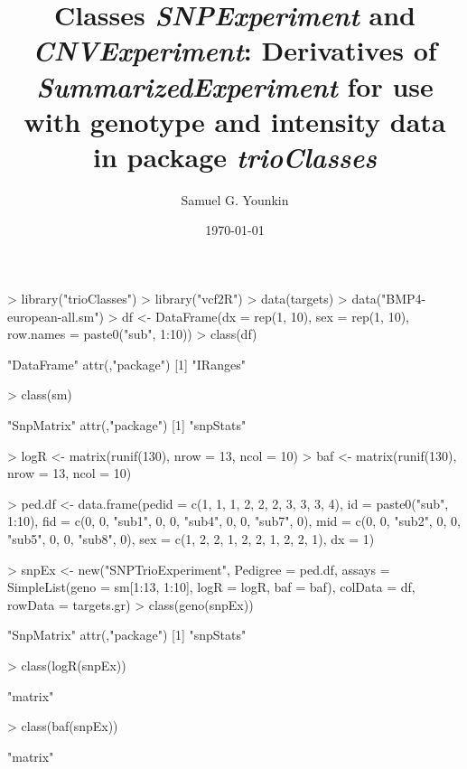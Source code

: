 \documentclass[10pt]{article}
\title{Classes \emph{SNPExperiment} and \emph{CNVExperiment}: Derivatives of \emph{SummarizedExperiment} for use with genotype and intensity data in package \emph{trioClasses}}
\author{Samuel G. Younkin}
\date{\today}
\begin{document}
\setlength{\parskip}{0.2\baselineskip}
\setlength{\parindent}{0pt}
\maketitle
\begin{Schunk}
\begin{Sinput}
> library("trioClasses")
> library("vcf2R")
> data(targets)
> data("BMP4-european-all.sm")
> df <- DataFrame(dx = rep(1, 10), sex = rep(1, 10), row.names = paste0("sub", 
     1:10))
> class(df)
\end{Sinput}
\begin{Soutput}
[1] "DataFrame"
attr(,"package")
[1] "IRanges"
\end{Soutput}
\begin{Sinput}
> class(sm)
\end{Sinput}
\begin{Soutput}
[1] "SnpMatrix"
attr(,"package")
[1] "snpStats"
\end{Soutput}
\begin{Sinput}
> logR <- matrix(runif(130), nrow = 13, ncol = 10)
> baf <- matrix(runif(130), nrow = 13, ncol = 10)
\end{Sinput}
\end{Schunk}
\begin{Schunk}
\begin{Sinput}
> ped.df <- data.frame(pedid = c(1, 1, 1, 2, 2, 2, 3, 3, 
     3, 4), id = paste0("sub", 1:10), fid = c(0, 0, "sub1", 
     0, 0, "sub4", 0, 0, "sub7", 0), mid = c(0, 0, "sub2", 
     0, 0, "sub5", 0, 0, "sub8", 0), sex = c(1, 2, 2, 
     1, 2, 2, 1, 2, 2, 1), dx = 1)
\end{Sinput}
\end{Schunk}
\begin{Schunk}
\begin{Sinput}
> snpEx <- new("SNPTrioExperiment", Pedigree = ped.df, 
     assays = SimpleList(geno = sm[1:13, 1:10], logR = logR, 
         baf = baf), colData = df, rowData = targets.gr)
> class(geno(snpEx))
\end{Sinput}
\begin{Soutput}
[1] "SnpMatrix"
attr(,"package")
[1] "snpStats"
\end{Soutput}
\begin{Sinput}
> class(logR(snpEx))
\end{Sinput}
\begin{Soutput}
[1] "matrix"
\end{Soutput}
\begin{Sinput}
> class(baf(snpEx))
\end{Sinput}
\begin{Soutput}
[1] "matrix"
\end{Soutput}
\end{Schunk}
\end{document}
